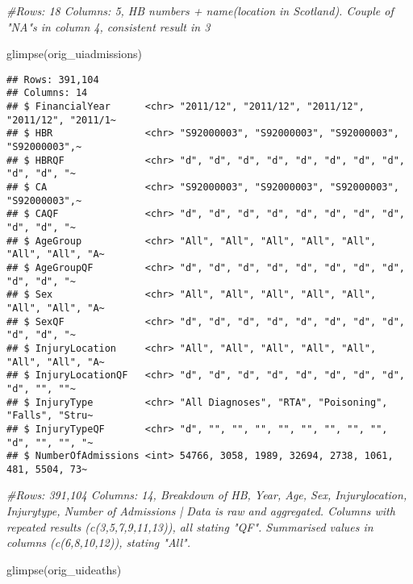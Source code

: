 \documentclass[
]{article}
\newenvironment{Shaded}{\begin{snugshade}}{\end{snugshade}}
\newcommand{\CommentTok}[1]{\textcolor[rgb]{0.56,0.35,0.01}{\textit{#1}}}
\newcommand{\FunctionTok}[1]{\textcolor[rgb]{0.00,0.00,0.00}{#1}}
\newcommand{\NormalTok}[1]{#1}
\begin{document}
\begin{Shaded}
\begin{Highlighting}[]
\CommentTok{\#Rows: 18 Columns: 5, HB numbers + name(location in Scotland). Couple of "NA"s in column 4, consistent result in 3}

\FunctionTok{glimpse}\NormalTok{(orig\_uiadmissions) }
\end{Highlighting}
\end{Shaded}

\begin{verbatim}
## Rows: 391,104
## Columns: 14
## $ FinancialYear      <chr> "2011/12", "2011/12", "2011/12", "2011/12", "2011/1~
## $ HBR                <chr> "S92000003", "S92000003", "S92000003", "S92000003",~
## $ HBRQF              <chr> "d", "d", "d", "d", "d", "d", "d", "d", "d", "d", "~
## $ CA                 <chr> "S92000003", "S92000003", "S92000003", "S92000003",~
## $ CAQF               <chr> "d", "d", "d", "d", "d", "d", "d", "d", "d", "d", "~
## $ AgeGroup           <chr> "All", "All", "All", "All", "All", "All", "All", "A~
## $ AgeGroupQF         <chr> "d", "d", "d", "d", "d", "d", "d", "d", "d", "d", "~
## $ Sex                <chr> "All", "All", "All", "All", "All", "All", "All", "A~
## $ SexQF              <chr> "d", "d", "d", "d", "d", "d", "d", "d", "d", "d", "~
## $ InjuryLocation     <chr> "All", "All", "All", "All", "All", "All", "All", "A~
## $ InjuryLocationQF   <chr> "d", "d", "d", "d", "d", "d", "d", "d", "d", "", ""~
## $ InjuryType         <chr> "All Diagnoses", "RTA", "Poisoning", "Falls", "Stru~
## $ InjuryTypeQF       <chr> "d", "", "", "", "", "", "", "", "", "d", "", "", "~
## $ NumberOfAdmissions <int> 54766, 3058, 1989, 32694, 2738, 1061, 481, 5504, 73~
\end{verbatim}

\begin{Shaded}
\begin{Highlighting}[]
\CommentTok{\#Rows: 391,104 Columns: 14, Breakdown of HB, Year, Age, Sex, Injurylocation, Injurytype, Number of Admissions | Data is raw and aggregated. Columns with repeated results (c(3,5,7,9,11,13)), all stating "QF". Summarised values in columns (c(6,8,10,12)), stating "All".}

\FunctionTok{glimpse}\NormalTok{(orig\_uideaths)}
\end{Highlighting}
\end{Shaded}
\end{document}
